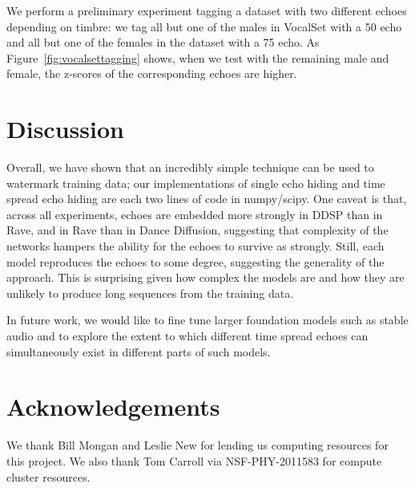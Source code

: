 \documentclass[letterpaper]{article} %
\begin{document}
We perform a preliminary experiment tagging a dataset with two different echoes depending on timbre: we tag all but one of the males in VocalSet with a 50 echo and all but one of the females in the dataset with a 75 echo.  As Figure~\ref{fig:vocalsettagging} shows, when we test with the remaining male and female, the z-scores of the corresponding echoes are higher.

\section{Discussion}
Overall, we have shown that an incredibly simple technique can be used to watermark training data; our implementations of single echo hiding and time spread echo hiding are each two lines of code in numpy/scipy.  One caveat is that, across all experiments, echoes are embedded more strongly in DDSP than in Rave, and in Rave than in Dance Diffusion, suggesting that complexity of the networks hampers the ability for the echoes to survive as strongly.  Still, each model reproduces the echoes to some degree, suggesting the generality of the approach.  This is surprising given how complex the models are and how they are unlikely to produce long sequences from the training data.

In future work, we would like to fine tune larger foundation models such as stable audio \cite{evans2024long} and to explore the extent to which different time spread echoes can simultaneously exist in different parts of such models.

\section{Acknowledgements}
We thank Bill Mongan and Leslie New for lending us computing resources for this project.  We also thank Tom Carroll via NSF-PHY-2011583 for compute cluster resources.


\end{document}
